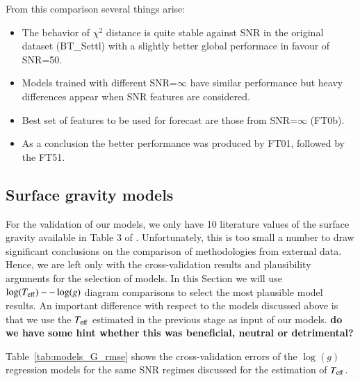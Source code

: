 From this comparison several things arise:
\begin{itemize}
 \item {The behavior of $\chi^2$ distance is quite stable against SNR 
	in the original dataset (BT\_Settl) with a slightly better global 
	performace in favour of SNR=50.}
 \item {Models trained with different SNR=$\infty$ have similar performance but heavy 
	differences appear when SNR features are considered.}
 \item {Best set of features to be used for forecast are those from SNR=$\infty$ (FT0b).}
 \item {As a conclusion the better performance was produced by FT01, followed by the FT51.}
\end{itemize}

\subsection{Surface gravity models}

For the validation of our models, we only have 10 literature values of
the surface gravity available in Table 3 of
\cite{cesetti}. Unfortunately, this is too small a number to draw
significant conclusions on the comparison of methodologies from
external data. Hence, we are left only with the cross-validation
results and plausibility arguments for the selection of models. In
this Section we will use $\log(T_{\rm eff})--\log(g)$ diagram
comparisons to select the most plausible model results. An important
difference with respect to the models discussed above is that we use
the $T_{\rm eff}$ estimated in the previous stage as input of our
models. {\bf do we have some hint whether this was beneficial, neutral
  or detrimental?}

Table~\ref{tab:models_G_rmse} shows the cross-validation errors of the
$\log(g)$ regression models for the same SNR regimes discussed for the
estimation of $T_{\rm eff}$. 

